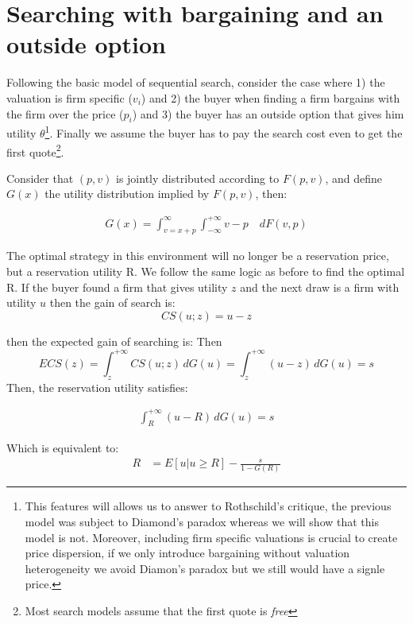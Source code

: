 \documentclass[12pt]{article}
\theoremstyle{plain}
\theoremstyle{plain}
\begin{document}
\section{Searching with bargaining and an outside option}


Following the basic model of sequential search, consider the case where 1) the valuation is firm specific ($v_i$) and 2) the buyer when finding a firm bargains with the firm over the price ($p_i$) and 3) the buyer has an outside option that gives him utility $\theta$\footnote{This features will allows us to answer to Rothschild's critique, the previous model was subject to Diamond's paradox whereas we will show that this model is not. Moreover, including firm specific valuations  is crucial to create price dispersion, if we only introduce bargaining without valuation heterogeneity we avoid Diamon's paradox but we still would have a signle price. }. Finally we assume the buyer has to pay the search cost even to get the first quote\footnote{Most search models assume that the first quote is \textit{free}}. 

Consider that $(p,v)$ is jointly distributed according to $F(p,v)$, and define $G(x)$ the utility distribution implied by $F(p,v)$, then: 

\begin{align*}
    G(x) = \int_{v= x+p}^\infty \int_{-\infty}^{+\infty} v-p \quad dF(v,p) 
\end{align*}

The optimal strategy in this environment will no longer be a reservation price, but a reservation utility R. We follow the same logic as before to find the optimal R. If the buyer found a firm that gives utility $z$ and the next draw is a firm with utility $u$ then the gain of search is: 
\[
CS(u; z) = u - z
\]

then the expected gain of searching is: 
Then
\[
ECS(z) = \int_z^{+\infty} CS(u; z)\, dG(u)
= \int_z^{+\infty} (u - z)\, dG(u) = s
\]
Then, the reservation utility satisfies: 

\begin{align}\label{eq:res_utility}
    \int_R^{+\infty} (u - R)\, dG(u) = s    
\end{align}

Which is equivalent to: 
\begin{align}\label{eq:res_utility2}
    R &=E[u|u\geq R]- \frac{s}{1-G(R)} 
\end{align}
\end{document}
